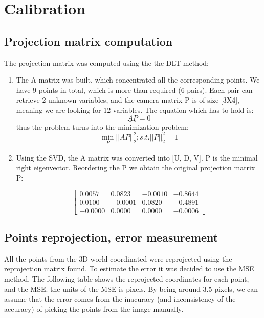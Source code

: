 \documentclass[a4paper]{iacas}
\begin{document}
\section{Calibration}

\subsection{Projection matrix computation}
The projection matrix was computed using the the DLT method:

\begin{enumerate}
\item The A matrix was built, which concentrated all the corresponding points. We have 9 points in total, which is more than required (6 pairs). Each pair can retrieve 2 unknown variables, and the camera matrix P is of size [3X4], meaning we are looking for 12 variables. The equation which has to hold is: 
\begin{equation*}
\underline{A}\underline{P} = 0
\end{equation*}
thus the problem turns into the minimization problem: $$\min\limits_{\underline{P}}||AP||_2^{2}   ; s.t. ||P||_{2}^{2}=1$$

\item Using the SVD, the A matrix was converted into [U, D, V]. P is the minimal right eigenvector. Reordering the P we obtain the original projection matrix P:

\begin{equation}
\left[
\begin{matrix}
    0.0057  &  0.0823 &  -0.0010 &  -0.8644 \\
    0.0100  & -0.0001 &   0.0820 &  -0.4891\\
   -0.0000  &  0.0000 &   0.0000 &  -0.0006
\end{matrix}
\right]
\end{equation}
\end{enumerate}



\subsection{Points reprojection, error measurement}

All the points from the 3D world coordinated were reprojected using the reprojection matrix found. To estimate the error it was decided to use the MSE method. The following table shows the reprojected coordinates for each point, and the MSE. the units of the MSE is pixels. By being around 3.5 pixels, we can assume that the error comes from the inacuracy (and inconsistency of the accuracy) of picking the points from the image manually.
\end{document}
